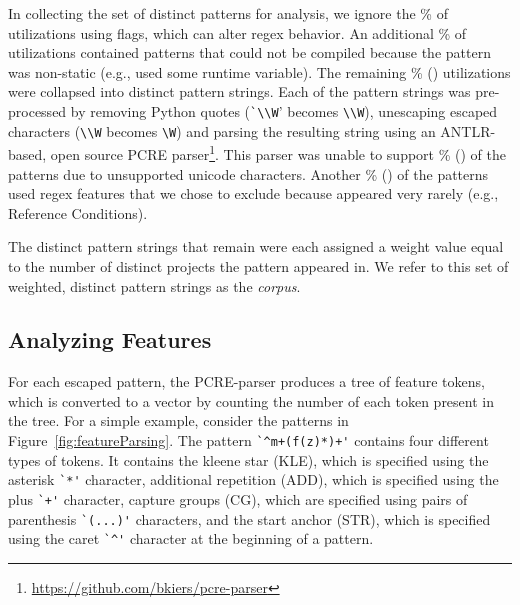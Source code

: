In collecting the set of distinct patterns for analysis,  we ignore the \%  of utilizations using flags, which can alter regex behavior.  An additional \% of utilizations contained patterns that could not be compiled because the pattern was non-static (e.g., used some runtime variable).
The remaining \% () utilizations were collapsed into  distinct pattern strings.  Each of the pattern strings was pre-processed by removing Python quotes (\verb!`\\W!' becomes \verb!\\W!), unescaping escaped characters (\verb!\\W! becomes \verb!\W!) and parsing the resulting  string using an ANTLR-based, open source PCRE parser\footnote{\url{https://github.com/bkiers/pcre-parser}}.
This parser was unable to support \% () of the patterns due to unsupported unicode characters.  Another \% () of the patterns used regex features that we  chose to exclude because appeared very rarely (e.g., Reference Conditions).

The  distinct pattern strings that remain were each assigned a weight value equal to the number of distinct projects the pattern appeared in.  We  refer to this set of weighted, distinct pattern strings as the \emph{corpus}.

\subsection{Analyzing Features}
\label{study:features}
For each escaped pattern, the PCRE-parser produces a tree of feature tokens, which is converted to a vector by counting the number of each token present in the tree.  For a simple example, consider the patterns in Figure~\ref{fig:featureParsing}.  The pattern \verb!`^m+(f(z)*)+'! contains four different types of tokens. It contains the kleene star (KLE), which is specified using the asterisk \verb!`*'! character, additional repetition (ADD), which is specified using the plus \verb!`+'! character, capture groups (CG), which are specified using pairs of parenthesis \verb!`(...)'! characters, and the start anchor (STR), which is specified using the caret \verb!`^'! character at the beginning of a pattern.

